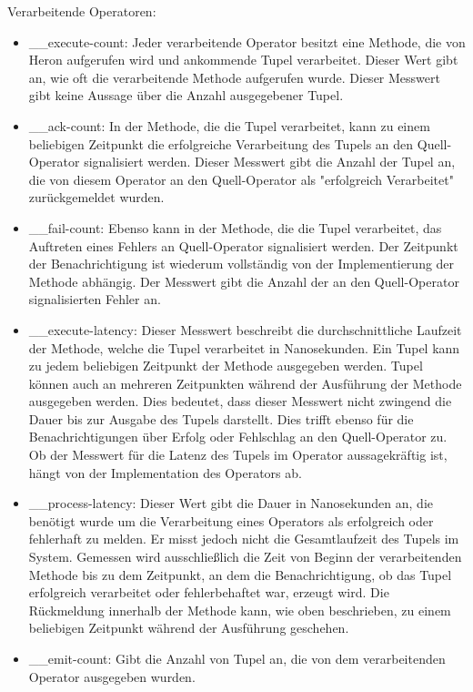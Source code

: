 Verarbeitende Operatoren:

\begin{itemize}
\item{\_\_execute-count: Jeder verarbeitende Operator besitzt eine Methode, die von Heron aufgerufen wird und ankommende Tupel verarbeitet. Dieser Wert gibt an, wie oft die verarbeitende Methode aufgerufen wurde. Dieser Messwert gibt keine Aussage über die Anzahl ausgegebener Tupel.}

\item{\_\_ack-count: In der Methode, die die Tupel verarbeitet, kann zu einem beliebigen Zeitpunkt die erfolgreiche Verarbeitung des Tupels an den Quell-Operator signalisiert werden. Dieser Messwert gibt die Anzahl der Tupel an, die von diesem Operator an den Quell-Operator als "erfolgreich Verarbeitet" zurückgemeldet wurden.}

\item{\_\_fail-count: Ebenso kann in der Methode, die die Tupel verarbeitet, das Auftreten eines Fehlers an Quell-Operator signalisiert werden. Der Zeitpunkt der Benachrichtigung ist wiederum vollständig von der Implementierung der Methode abhängig. Der Messwert gibt die Anzahl der an den Quell-Operator signalisierten Fehler an.}

\item{\_\_execute-latency: Dieser Messwert beschreibt die durchschnittliche Laufzeit der Methode, welche die Tupel verarbeitet in Nanosekunden. Ein Tupel kann zu jedem beliebigen Zeitpunkt der Methode ausgegeben werden. Tupel können auch an mehreren Zeitpunkten während der Ausführung der Methode ausgegeben werden. Dies bedeutet, dass dieser Messwert nicht zwingend die Dauer bis zur Ausgabe des Tupels darstellt. Dies trifft ebenso für die Benachrichtigungen über Erfolg oder Fehlschlag an den Quell-Operator zu. Ob der Messwert für die Latenz des Tupels im Operator aussagekräftig ist, hängt von der Implementation des Operators ab.}

\item{\_\_process-latency: Dieser Wert gibt die Dauer in Nanosekunden an, die benötigt wurde um die Verarbeitung eines Operators als erfolgreich oder fehlerhaft zu melden. Er misst jedoch nicht die Gesamtlaufzeit des Tupels im System. Gemessen wird ausschließlich die Zeit von Beginn der verarbeitenden Methode bis zu dem Zeitpunkt, an dem die Benachrichtigung, ob das Tupel erfolgreich verarbeitet oder fehlerbehaftet war, erzeugt wird. Die Rückmeldung innerhalb der Methode kann, wie oben beschrieben, zu einem beliebigen Zeitpunkt während der Ausführung geschehen.}

\item{\_\_emit-count: Gibt die Anzahl von Tupel an, die von dem verarbeitenden Operator ausgegeben wurden.}

\end{itemize}


